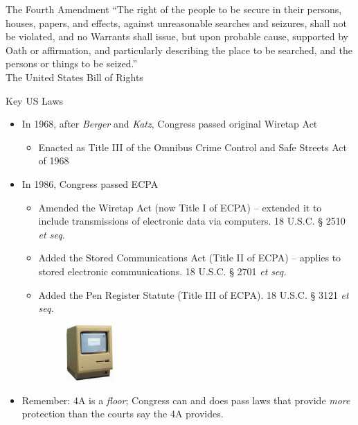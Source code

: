 \documentclass[nobackground,dvipsnames,table]{beamer}
\begin{document}
\begin{frame}{The Fourth Amendment}
    “The right of the people to be secure in their  persons,  houses,  papers,  and effects,  against  unreasonable  searches and  seizures,  shall  not  be  violated,  and no  Warrants  shall  issue,  but  upon probable  cause,  supported  by  Oath  or affirmation,  and  particularly  describing the  place  to  be  searched,  and  the persons or things to be seized.”\\
    \small{The United States Bill of Rights}
\end{frame}

\begin{frame}{Key US Laws}
    \begin{itemize}
        \item In 1968, after \textit{Berger} and \textit{Katz}, Congress passed original Wiretap Act
        \begin{itemize}
            \item Enacted as Title III of the Omnibus Crime Control and Safe Streets Act of 1968
        \end{itemize}
        
        \item In 1986, Congress passed ECPA
        \begin{itemize}
            \item Amended the Wiretap Act (now Title I of ECPA) -- extended it to include transmissions of electronic data via computers. 18 U.S.C. § 2510 \textit{et seq.}
            \item Added the Stored Communications Act (Title II of ECPA) -- applies to stored electronic communications. 18 U.S.C. § 2701 \textit{et seq.}
            \item Added the Pen Register Statute (Title III of ECPA). 18 U.S.C. § 3121 \textit{et seq.}
            \begin{figure}
                \includegraphics[width=0.18\textwidth]{old-computer}
            \end{figure} %
        \end{itemize}
        
        \item Remember: 4A is a \textit{floor}; Congress can and does pass laws that provide \textit{more} protection than the courts say the 4A provides.
    \end{itemize}
\end{frame}
\end{document}
